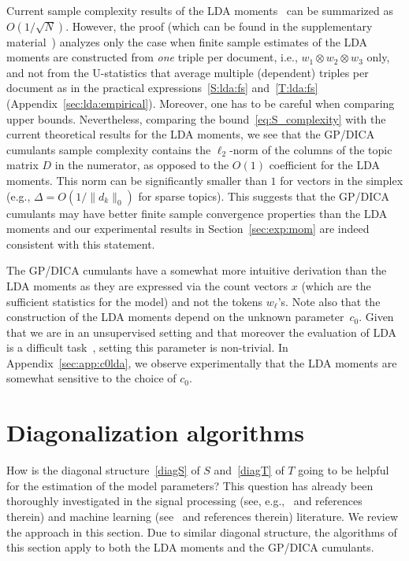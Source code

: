 \documentclass{article}
\newcommand{\normp}[1]{\|#1\|}
\newcommand{\tp}{\otimes}
\begin{document}
Current sample complexity results of the LDA moments~\cite{AnaEtAl2012} can be summarized as $O(1/\sqrt{N})$. However, the proof (which can be found in the supplementary material~\cite{AnaEtAl2013}) analyzes only the case when finite sample estimates of the LDA moments are constructed from \emph{one} triple per document, i.e., $w_{1}\tp w_{2} \tp w_{3}$ only, and not from the U-statistics that average multiple (dependent) triples per document as in the practical expressions~\eqref{S:lda:fs} and~\eqref{T:lda:fs} (Appendix~\ref{sec:lda:empirical}). Moreover, one has to be careful when comparing upper bounds. Nevertheless, comparing the bound~\eqref{eq:S_complexity} with the current theoretical results for the LDA moments, we see that the GP/DICA cumulants sample complexity contains the $\ell_2$-norm of the columns of the topic matrix $D$ in the numerator, as opposed to the $O(1)$ coefficient for the LDA moments. This norm can be significantly smaller than $1$ for vectors in the simplex (e.g., $\Delta = O(1/\normp{d_k}_0)$ for sparse topics). This suggests that the GP/DICA cumulants may have better finite sample convergence properties than the LDA moments and our experimental results in Section~\ref{sec:exp:mom} are indeed consistent with this statement.

The GP/DICA cumulants have a somewhat more intuitive derivation than the LDA moments as they are expressed via the count vectors $x$ (which are the sufficient statistics for the model) and not the tokens $w_\ell$'s.
Note also that the construction of the LDA moments depend on the unknown parameter~$c_0$. Given that we are in an unsupervised setting and that moreover the evaluation of LDA is a difficult task~\cite{WalEtAl2009}, setting this parameter is non-trivial. In Appendix~\ref{sec:app:c0lda}, we observe experimentally that the LDA moments are somewhat sensitive to the choice of $c_0$.












\section{Diagonalization algorithms} \label{sec:diag} 

How is the diagonal structure~\eqref{diagS} of $S$ and~\eqref{diagT} of $T$ going to be helpful for the estimation of the model parameters? This question has already been thoroughly investigated in the signal processing (see, e.g.,~\cite{Car1989,Car1990,CarCom1996,Hyv1999,CarSou1993,ComJut2010} and references therein) and machine learning  (see~\cite{AnaEtAl2012,AnaEtAl2014} and references therein) literature. We review the approach in this section. Due to similar diagonal structure, the algorithms of this section apply to both the LDA moments and the GP/DICA cumulants.
\end{document}
